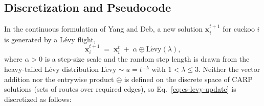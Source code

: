 \subsection{Discretization and Pseudocode}
\label{subsec:cs-discretization}

In the continuous formulation of Yang and Deb, a new solution
$\mathbf{x}_i^{t+1}$ for cuckoo $i$ is generated by a L\'evy flight,
\begin{equation}
  \mathbf{x}_i^{t+1} \;=\; \mathbf{x}_i^{t} \;+\; \alpha \oplus
  \mathrm{L\acute{e}vy}(\lambda),
  \label{eq:cs-levy-update}
\end{equation}
where $\alpha > 0$ is a step-size scale and the random step length is drawn
from the heavy-tailed L\'evy distribution
$\mathrm{L\acute{e}vy} \sim u = t^{-\lambda}$ with $1 < \lambda \leq 3$.
Neither the vector addition nor the entrywise product $\oplus$ is defined on
the discrete space of CARP solutions (sets of routes over required edges), so
Eq.~\eqref{eq:cs-levy-update} is discretized as follows:

